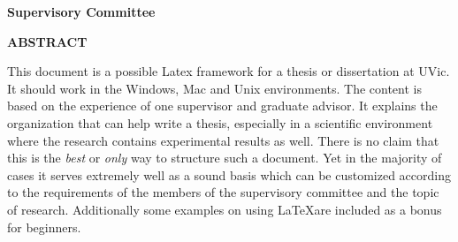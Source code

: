 \newpage
{}

\noindent \textbf{Supervisory Committee}
\tpbreak
\panel %

\begin{center}
\textbf{ABSTRACT}
\end{center}

This document is a possible Latex framework for a thesis or dissertation at UVic. It should work in the Windows, Mac and Unix environments. The content is based on the experience of one supervisor and graduate advisor. It explains the organization that can help write a thesis, especially in a scientific environment where the research contains experimental results as well. There is no claim that this is the \textit{best} or \textit{only} way to structure such a document. Yet in the majority of cases it serves extremely well as a sound basis which can be customized according to the requirements of the members of the supervisory committee and the topic of  research. Additionally some examples on using \LaTeX are included as a bonus for beginners.
